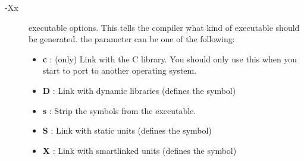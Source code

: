 \documentclass{report}
\begin{document}
\begin{description}
\item [-Xx]  executable options. This tells the compiler what
kind of executable should be generated. the parameter 
can be one of the following:
\begin{itemize}
\item \textbf{c} : (\linux only) Link with the C library. You should only use this when
  you start to port \fpc to another operating system.
\item \textbf{D} : Link with dynamic libraries (defines the
 symbol)
\item \textbf{s} : Strip the symbols from the executable.
\item \textbf{S} : Link with static units (defines the  symbol)
\item \textbf{X} : Link with smartlinked units (defines the
 symbol)
\end{itemize}
\end{description}

%
%

\end{document}
